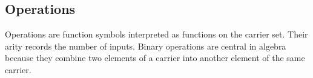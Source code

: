 \subsection{Operations}
\label{subsec:structure-operations}

\begin{remark*}[Exposition]
Operations are function symbols interpreted as functions on the carrier set.
Their arity records the number of inputs.  Binary operations are central in
algebra because they combine two elements of a carrier into another element of
the same carrier.
\end{remark*}
